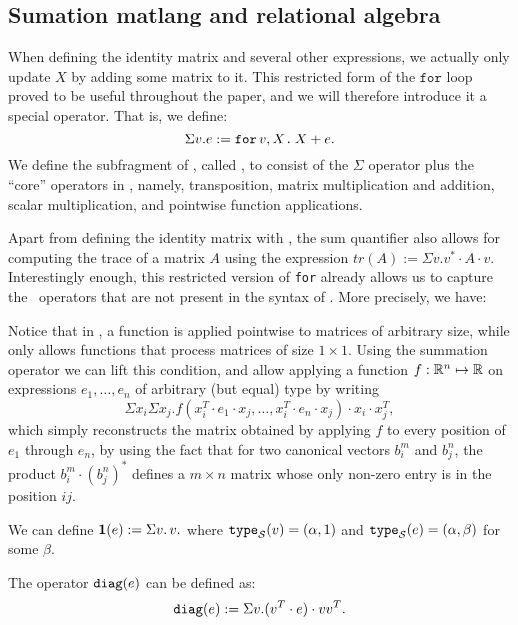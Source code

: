 
\newcommand{\hprod}{\circ}

\subsection{Sumation matlang and relational algebra}

When defining the identity matrix and several other expressions, we actually only update $X$ by adding some matrix to it. This restricted form of the $\texttt{for}$ loop proved to be useful throughout the paper, and we will therefore introduce it a special operator. That is, we define:
$$\Sigma v. e := \texttt{for}\, v,X \texttt{.}\, X + e.$$
We define the subfragment of \langfor, called \langsum, to consist of the $\Sigma$ operator plus the ``core'' operators in \lang, namely, transposition, matrix multiplication and addition, scalar multiplication, and pointwise function applications.

Apart from defining the identity matrix with \langsum, the sum quantifier also allows for computing the trace of a matrix $A$ using the expression $tr(A) := \Sigma v. v^*\cdot A \cdot v$. Interestingly enough, this restricted version of \texttt{for} already allows us to capture the \lang\ operators that are not present in the syntax of \langsum. More precisely, we have:
\smallskip

 Notice that in \lang, a function is applied pointwise to matrices of arbitrary size, while \langsum only allows functions that process matrices of size $1\times 1$. Using the summation operator we can lift this condition, and allow applying a function $f:\mathbb{\mathbb{R}}^n \mapsto \mathbb{\mathbb{R}}$ on expressions $e_1,\ldots ,e_n$ of arbitrary (but equal) type by writing 
$$\Sigma x_i \Sigma x_j. f(x_i^T\cdot e_1\cdot x_j, \ldots ,x_i^T\cdot e_n\cdot x_j) \cdot x_i\cdot x_j^T,$$
which simply reconstructs the matrix obtained by applying $f$ to every position of $e_1$ through $e_n$, by using the fact that for two canonical vectors $b_i^m$ and $b_j^n$, the product $b_i^m \cdot (b_j^n)^*$ defines a $m\times n$ matrix whose only non-zero entry is in the position $ij$.
\smallskip

 We can define $\mathbf{1}(e) := \Sigma v.\, v.$ where $\texttt{type}_{\mathcal{S}}(v) = (\alpha, 1)$ and $\texttt{type}_{\mathcal{S}}(e) = (\alpha, \beta)$ for some $\beta$. 
\smallskip

 The operator $\texttt{diag}(e)$ can be defined as:
$$\texttt{diag}(e) := \Sigma v. (v^T\cdot e) \cdot vv^T.$$


